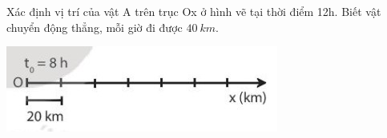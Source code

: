 \begin{ex}
	Xác định vị trí của vật A trên trục Ox ở hình vẽ tại thời điểm 12h. Biết vật chuyển động thẳng, mỗi giờ đi được $\SI{40}{km}$.
	
	\begin{center}
		\includegraphics[scale=1]{figs/G10Y25B3-9}
	\end{center}
\end{ex}

